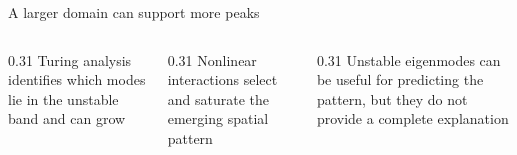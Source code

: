 \begin{frame}{A larger domain can support more peaks}
\begin{columns}[T,onlytextwidth]
  \end{columns}

  \vspace{1.08cm}

  \begin{columns}[T,onlytextwidth]
    \begin{column}{0.31\textwidth}
        {Turing analysis identifies which modes lie in the unstable band and can grow}
    \end{column}

    \begin{column}{0.31\textwidth}
        {Nonlinear interactions select and saturate the emerging spatial pattern}
    \end{column}

    \begin{column}{0.31\textwidth}
        {Unstable eigenmodes can be useful for predicting the pattern, but they do not provide a complete explanation}
    \end{column}
  \end{columns}

\end{frame}
